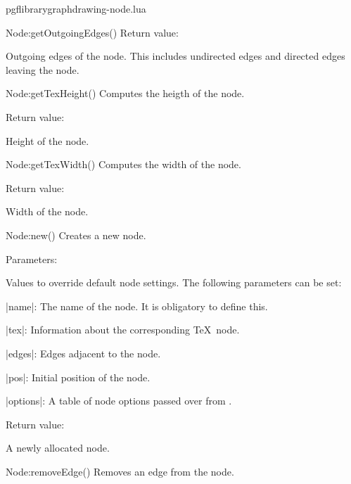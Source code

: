 \begin{filedescription}{pgflibrarygraphdrawing-node.lua}
\begin{luacommand}{{Node:getOutgoingEdges}()}
Return value:
\begin{parameterdescription} 
  \item[] Outgoing edges of the node. This includes undirected edges and directed edges leaving the node. 
\end{parameterdescription}


\end{luacommand}
\begin{luacommand}{{Node:getTexHeight}()}
Computes the heigth of the node. 


Return value:
\begin{parameterdescription} 
  \item[] Height of the node. 
\end{parameterdescription}


\end{luacommand}
\begin{luacommand}{{Node:getTexWidth}()}
Computes the width of the node. 


Return value:
\begin{parameterdescription} 
  \item[] Width of the node. 
\end{parameterdescription}


\end{luacommand}
\begin{luacommand}{{Node:new}()}
Creates a new node. 

Parameters:
\begin{parameterdescription}
	\item[\meta{values}] Values to override default node settings. The following parameters can be set:\par |name|: The name of the node. It is obligatory to define this.\par |tex|: Information about the corresponding \TeX\ node.\par |edges|: Edges adjacent to the node.\par |pos|: Initial position of the node.\par |options|: A table of node options passed over from \tikzname. 
\end{parameterdescription}


Return value:
\begin{parameterdescription} 
  \item[] A newly allocated node. 
\end{parameterdescription}


\end{luacommand}
\begin{luacommand}{{Node:removeEdge}()}
Removes an edge from the node. 


\end{luacommand}
\end{filedescription}
